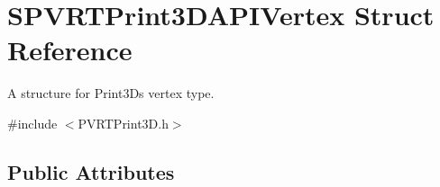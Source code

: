 \hypertarget{struct_s_p_v_r_t_print3_d_a_p_i_vertex}{\section{S\+P\+V\+R\+T\+Print3\+D\+A\+P\+I\+Vertex Struct Reference}
\label{struct_s_p_v_r_t_print3_d_a_p_i_vertex}
}


A structure for Print3\+Ds vertex type.  




{\ttfamily \#include $<$P\+V\+R\+T\+Print3\+D.\+h$>$}

\subsection*{Public Attributes}
